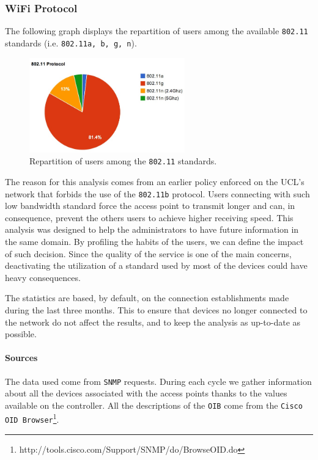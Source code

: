 \subsubsection*{WiFi Protocol}

The following graph displays the repartition of users among the available \texttt{802.11} standards (i.e. \texttt{802.11a, b, g, n}). 

\begin{figure}[H]
	\centering
   \includegraphics[width=0.6\textwidth]{Pictures/chapter5/ip-proto.jpg}
   \caption{Repartition of users among the \texttt{802.11} standards.}
\end{figure} 

The reason for this analysis comes from an earlier policy enforced on the UCL's network that forbids the use of the \texttt{802.11b} protocol. Users connecting with such low bandwidth standard force the access point to transmit longer and can, in consequence, prevent the others users to achieve higher receiving speed. This analysis was designed to help the administrators to have future information in the same domain. By profiling the habits of the users, we can define the impact of such decision. Since the quality of the service is one of the main concerns, deactivating the utilization of a standard used by most of the devices could have heavy consequences.

The statistics are based, by default, on the connection establishments made during the last three months. This to ensure that devices no longer connected to the network do not affect the results, and to keep the analysis as up-to-date as possible.

\paragraph*{Sources} The data used come from \texttt{SNMP} requests. During each cycle we gather information about all the devices associated with the access points thanks to the values available on the controller. All the descriptions of the \texttt{OIB} come from the \texttt{Cisco OID Browser}\footnote{http://tools.cisco.com/Support/SNMP/do/BrowseOID.do}.

